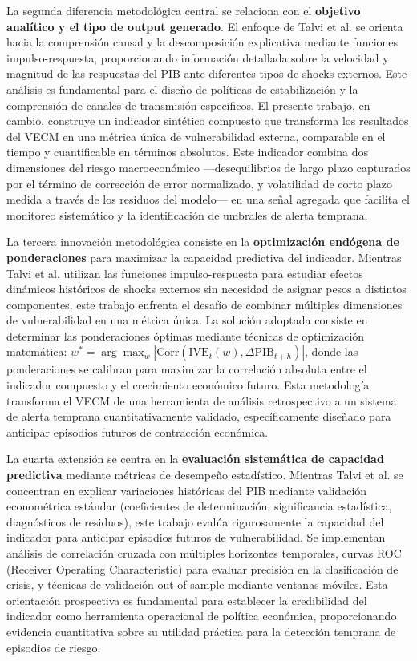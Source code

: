 \documentclass[3p,11pt]{elsarticle}
\begin{document}
La segunda diferencia metodológica central se relaciona con el \textbf{objetivo analítico y el tipo de output generado}. El enfoque de Talvi et al. se orienta hacia la comprensión causal y la descomposición explicativa mediante funciones impulso-respuesta, proporcionando información detallada sobre la velocidad y magnitud de las respuestas del PIB ante diferentes tipos de shocks externos. Este análisis es fundamental para el diseño de políticas de estabilización y la comprensión de canales de transmisión específicos. El presente trabajo, en cambio, construye un indicador sintético compuesto que transforma los resultados del VECM en una métrica única de vulnerabilidad externa, comparable en el tiempo y cuantificable en términos absolutos. Este indicador combina dos dimensiones del riesgo macroeconómico ---desequilibrios de largo plazo capturados por el término de corrección de error normalizado, y volatilidad de corto plazo medida a través de los residuos del modelo--- en una señal agregada que facilita el monitoreo sistemático y la identificación de umbrales de alerta temprana.

La tercera innovación metodológica consiste en la \textbf{optimización endógena de ponderaciones} para maximizar la capacidad predictiva del indicador. Mientras Talvi et al. utilizan las funciones impulso-respuesta para estudiar efectos dinámicos históricos de shocks externos sin necesidad de asignar pesos a distintos componentes, este trabajo enfrenta el desafío de combinar múltiples dimensiones de vulnerabilidad en una métrica única. La solución adoptada consiste en determinar las ponderaciones óptimas mediante técnicas de optimización matemática: $w^* = \arg\max_w |\text{Corr}(\text{IVE}_t(w), \Delta \text{PIB}_{t+h})|$, donde las ponderaciones se calibran para maximizar la correlación absoluta entre el indicador compuesto y el crecimiento económico futuro. Esta metodología transforma el VECM de una herramienta de análisis retrospectivo a un sistema de alerta temprana cuantitativamente validado, específicamente diseñado para anticipar episodios futuros de contracción económica.

La cuarta extensión se centra en la \textbf{evaluación sistemática de capacidad predictiva} mediante métricas de desempeño estadístico. Mientras Talvi et al. se concentran en explicar variaciones históricas del PIB mediante validación econométrica estándar (coeficientes de determinación, significancia estadística, diagnósticos de residuos), este trabajo evalúa rigurosamente la capacidad del indicador para anticipar episodios futuros de vulnerabilidad. Se implementan análisis de correlación cruzada con múltiples horizontes temporales, curvas ROC (Receiver Operating Characteristic) para evaluar precisión en la clasificación de crisis, y técnicas de validación out-of-sample mediante ventanas móviles. Esta orientación prospectiva es fundamental para establecer la credibilidad del indicador como herramienta operacional de política económica, proporcionando evidencia cuantitativa sobre su utilidad práctica para la detección temprana de episodios de riesgo.
\end{document}
